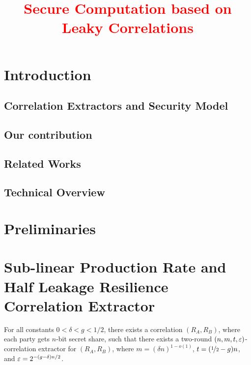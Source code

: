\documentclass{llncs}
\title{\textcolor{red}{Secure Computation based on Leaky Correlations}}
\date{}
\author{}
\institute{}
\begin{document}
\maketitle




\section{Introduction}

	\subsection{Correlation Extractors and Security Model}
	\subsection{Our contribution}
		
	\subsection{Related Works}
	\subsection{Technical Overview}

\section{Preliminaries}

\section{Sub-linear Production Rate and Half Leakage Resilience Correlation Extractor}
	\begin{theorem}
	\label{thm:construction}
	For all constants $0<\delta<g<1/2$, there exists a correlation $(R_A,R_B)$, where each party gets $n$-bit secret share, such that there exists a two-round $(n,m,t,\varepsilon)$-correlation extractor for $(R_A,R_B)$, where $m=(\delta n)^{1-o(1)}$, $t=(\nicefrac12-g)n$, and $\varepsilon=2^{-(g-\delta)n/2}$. 
	\end{theorem}
\end{document}
